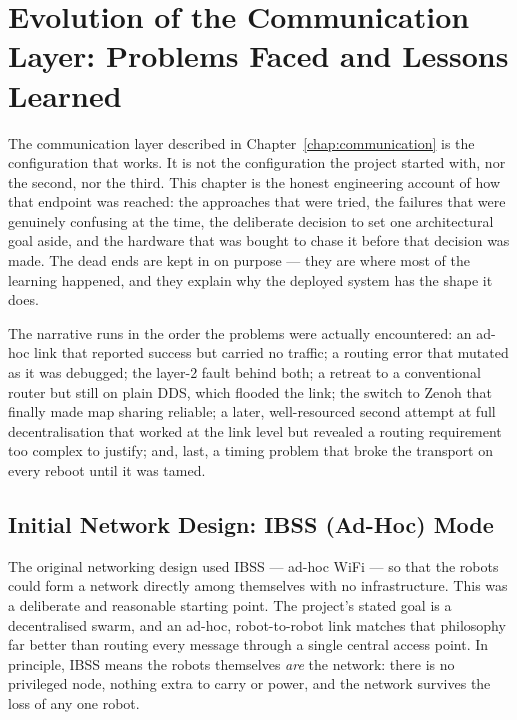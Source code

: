 
\chapter{Evolution of the Communication Layer: Problems Faced and Lessons Learned}
\label{chap:comms_issues}

The communication layer described in Chapter~\ref{chap:communication} is the configuration that works. It is not the configuration the project started with, nor the second, nor the third. This chapter is the honest engineering account of how that endpoint was reached: the approaches that were tried, the failures that were genuinely confusing at the time, the deliberate decision to set one architectural goal aside, and the hardware that was bought to chase it before that decision was made. The dead ends are kept in on purpose --- they are where most of the learning happened, and they explain why the deployed system has the shape it does.

The narrative runs in the order the problems were actually encountered: an ad-hoc link that reported success but carried no traffic; a routing error that mutated as it was debugged; the layer-2 fault behind both; a retreat to a conventional router but still on plain DDS, which flooded the link; the switch to Zenoh that finally made map sharing reliable; a later, well-resourced second attempt at full decentralisation that worked at the link level but revealed a routing requirement too complex to justify; and, last, a timing problem that broke the transport on every reboot until it was tamed.

\section{Initial Network Design: IBSS (Ad-Hoc) Mode}
\label{sec:ibss}

The original networking design used IBSS --- ad-hoc WiFi --- so that the robots could form a network directly among themselves with no infrastructure. This was a deliberate and reasonable starting point. The project's stated goal is a decentralised swarm, and an ad-hoc, robot-to-robot link matches that philosophy far better than routing every message through a single central access point. In principle, IBSS means the robots themselves \emph{are} the network: there is no privileged node, nothing extra to carry or power, and the network survives the loss of any one robot.

